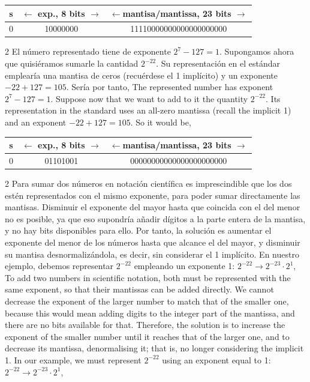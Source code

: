 \begin{center}
\begin{tabular}{|c||c||c|}
\hline
s&$\leftarrow$ exp., 8 bits $\rightarrow$&$\leftarrow$mantisa/mantissa, 23 bits $\rightarrow$\\
\hline
0&10000000&11110000000000000000000\\
\hline
\end{tabular}
\end{center}
\begin{paracol}{2}
El número representado tiene de exponente $2^7-127=1$. Supongamos ahora que quisiéramos sumarle la cantidad $2^{-22}$. Su representación en el estándar emplearía una mantisa de ceros (recuérdese el 1 implícito) y un exponente $-22+127=105$. Sería por tanto,
\switchcolumn
The represented number has exponent $2^7-127=1$. Suppose now that we want to add to it the quantity $2^{-22}$. Its representation in the standard uses an all-zero mantissa (recall the implicit 1) and an exponent $-22+127 = 105$. So it would be,
\end{paracol}
\begin{center}
\begin{tabular}{|c||c||c|}
\hline
s&$\leftarrow$ exp., 8 bits $\rightarrow$&$\leftarrow$mantisa/mantissa, 23 bits $\rightarrow$\\
\hline
0&01101001&00000000000000000000000\\
\hline
\end{tabular}
\end{center}
\begin{paracol}{2}
Para sumar dos números en notación cientí\-fica es imprescindible que los dos estén representados con el mismo exponente, para poder sumar directamente las mantisas. Disminuir el exponente del mayor hasta que coincida con el del menor no es posible, ya que eso supondría añadir dígitos a la parte entera de la mantisa, y no hay bits disponibles para ello. Por tanto, la solución es aumentar el exponente del menor de los números hasta que alcance el del mayor, y disminuir su mantisa desnormalizándola, es decir, sin considerar el 1 implícito.
En nuestro ejemplo, debemos representar $2^{-22}$ empleando un exponente 1: $2^{-22}\rightarrow 2^{-23}\cdot 2^1$,
\switchcolumn
To add two numbers in scientific notation, both must be represented with the same exponent, so that their mantissas can be added directly. We cannot decrease the exponent of the larger number to match that of the smaller one, because this would mean adding digits to the integer part of the mantissa, and there are no bits available for that. Therefore, the solution is to increase the exponent of the smaller number until it reaches that of the larger one, and to decrease its mantissa, denormalising it; that is, no longer considering the implicit 1. In our example, we must represent $2^{-22}$ using an exponent equal to 1: $2^{-22}\rightarrow 2^{-23}\cdot 2^1$,
\end{paracol}

